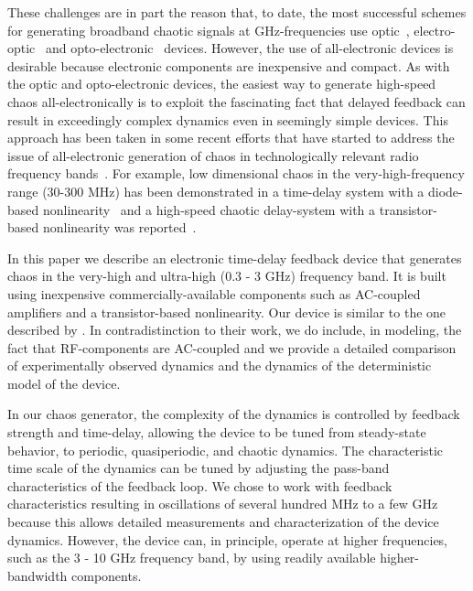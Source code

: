 \documentclass[aps,twocolumn,pre,nofootinbib]{revtex4}
\begin{document}
These challenges are in part the reason that, to date, the most successful schemes for generating broadband chaotic signals at GHz-frequencies use optic~\cite{VanWiggeren1998,Fischer2000,Kusumoto2002}, electro-optic~\cite{Argyris2005,Pallavisini2007} and opto-electronic~\cite{Abarbanel2001,Blakely2004QE} devices. However, the use of all-electronic devices is desirable because electronic components are inexpensive and compact.
 As with the optic and opto-electronic devices, the easiest way to generate high-speed chaos all-electronically is to exploit the fascinating fact that delayed feedback can result in exceedingly complex dynamics even in seemingly simple devices.  
This approach has been taken in some recent efforts that have started to address the issue of all-electronic generation of chaos in technologically relevant radio frequency bands~\cite{blakely2004Chaos,Blakely2005,Mykolaitis2003}.
For example, low dimensional chaos in the very-high-frequency range (30-300 MHz) has been demonstrated in a time-delay system with a diode-based nonlinearity~\cite{Blakely2005} and a high-speed chaotic delay-system with a transistor-based nonlinearity was reported~\cite{Mykolaitis2003}.

In this paper we describe an electronic time-delay feedback device that generates chaos in the very-high and ultra-high (0.3 - 3 GHz) frequency band. It is built using inexpensive commercially-available components such as AC-coupled amplifiers and a transistor-based nonlinearity.
Our device is similar to the one described by \citet{Mykolaitis2003}. In contradistinction to their work, we do include, in modeling, the fact that RF-components are AC-coupled and we provide a detailed comparison of experimentally observed dynamics and the dynamics of the deterministic model of the device.


In our chaos generator, the complexity of the dynamics is controlled by feedback strength and time-delay, allowing the device to be tuned from steady-state behavior, to periodic, quasiperiodic, and chaotic dynamics. The characteristic time scale of the dynamics can be tuned by adjusting the pass-band characteristics of the feedback loop.
We chose to work with feedback characteristics resulting in oscillations of several hundred MHz to a few GHz because this allows detailed measurements and characterization of the device dynamics.
However, the device can, in principle, operate at higher frequencies, such as the 3 - 10 GHz frequency band, by using readily available higher-bandwidth components.
\end{document}
